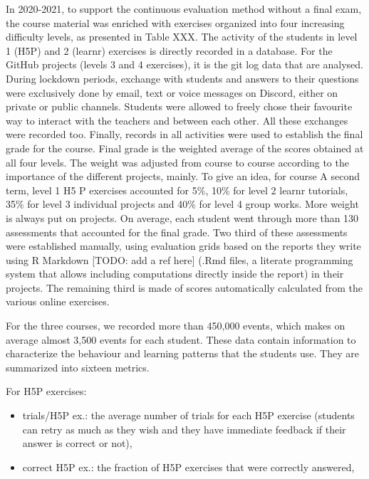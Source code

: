 \documentclass{aims}
\theoremstyle{definition}
\begin{document}
In 2020-2021, to support the continuous evaluation method without a
final exam, the course material was enriched with exercises organized
into four increasing difficulty levels, as presented in Table XXX. The
activity of the students in level 1 (H5P) and 2 (learnr) exercises is
directly recorded in a database. For the GitHub projects (levels 3 and 4
exercises), it is the git log data that are analysed. During lockdown
periods, exchange with students and answers to their questions were
exclusively done by email, text or voice messages on Discord, either on
private or public channels. Students were allowed to freely chose their
favourite way to interact with the teachers and between each other. All
these exchanges were recorded too. Finally, records in all activities
were used to establish the final grade for the course. Final grade is
the weighted average of the scores obtained at all four levels. The
weight was adjusted from course to course according to the importance of
the different projects, mainly. To give an idea, for course A second
term, level 1 H5 P exercises accounted for 5\%, 10\% for level 2 learnr
tutorials, 35\% for level 3 individual projects and 40\% for level 4
group works. More weight is always put on projects. On average, each
student went through more than 130 assessments that accounted for the
final grade. Two third of these assessments were established manually,
using evaluation grids based on the reports they write using R Markdown
{[}TODO: add a ref here{]} (.Rmd files, a literate programming system
that allows including computations directly inside the report) in their
projects. The remaining third is made of scores automatically calculated
from the various online exercises.

For the three courses, we recorded more than 450,000 events, which makes
on average almost 3,500 events for each student. These data contain
information to characterize the behaviour and learning patterns that the
students use. They are summarized into sixteen metrics.

For H5P exercises:

\begin{itemize}
\item
  trials/H5P ex.: the average number of trials for each H5P exercise
  (students can retry as much as they wish and they have immediate
  feedback if their answer is correct or not),
\item
  correct H5P ex.: the fraction of H5P exercises that were correctly
  answered,
\end{itemize}
\end{document}
